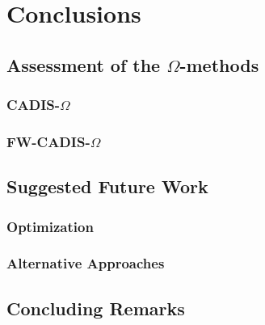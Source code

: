 \chapter{Conclusions}

\section{Assessment of the $\Omega$-methods}
\subsection{CADIS-$\Omega$}
\subsection{FW-CADIS-$\Omega$}
\section{Suggested Future Work}
\subsection{Optimization}
\subsection{Alternative Approaches}
\section{Concluding Remarks}

